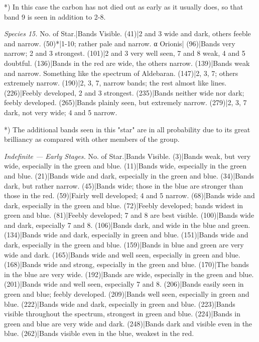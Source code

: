 \documentclass[a4paper, 12pt, oneside, polutonikogreek, english]{article}
\begin{document}
*) In this case the carbon has not died out as early as it usually does, so that band 9 is seen in addition to 2-8.

\emph{Species 15.} 
No. of Star.|Bands Visible. 
(41)|2 and 3 wide and dark, others feeble and narrow. 
(50)*|1-10; rather pale and narrow. 
α Orionis| 
(96)|Bands very narrow; 2 and 3 strongest. 
(101)|2 and 3 very well seen, 7 and 8 weak, 4 and 5 doubtful. 
(136)|Bands in the red are wide, the others narrow. 
(139)|Bands weak and narrow. Something like the spectrum of Aldebaran. 
(147)|2, 3, 7; others extremely narrow. 
(190)|2, 3, 7, narrow bands; the rest almost like lines. 
(226)|Feebly developed, 2 and 3 strongest. 
(235)|Bands neither wide nor dark; feebly developed. 
(265)|Bands plainly seen, but extremely narrow. 
(279)|2, 3, 7 dark, not very wide; 4 and 5 narrow. 

*) The additional bands seen in this "star" are in all probability due to its great brilliancy as compared with other members of the group.

\emph{Indefinite --- Early Stages.} 
No. of Star.|Bands Visible. 
(3)|Bands weak, but very wide, especially in the green and blue. 
(11)|Bands wide, especially in the green and blue. 
(21)|Bands wide and dark, especially in the green and blue. 
(34)|Bands dark, but rather narrow. 
(45)|Bands wide; those in the blue are stronger than those in the red. 
(59)|Fairly well developed; 4 and 5 narrow. 
(68)|Bands wide and dark, especially in the green and blue. 
(72)|Feebly developed; bands widest in green and blue. 
(81)|Feebly developed; 7 and 8 are best visible. 
(100)|Bands wide and dark, especially 7 and 8. 
(106)|Bands dark, and wide in the blue and green.  
(134)|Bands wide and dark, especially in green and blue. 
(151)|Bands wide and dark, especially in the green and blue. 
(159)|Bands in blue and green are very wide and dark. 
(165)|Bands wide and well seen, especially in green and blue. 
(168)|Bands wide and strong, especially in the green and blue. 
(170)|The bands in the blue are very wide. 
(192)|Bands are wide, especially in the green and blue. 
(201)|Bands wide and well seen, especially 7 and 8. 
(206)|Bands easily seen in green and blue; feebly developed. 
(209)|Bands well seen, especially in green and blue. 
(222)|Bands wide and dark, especially in green and blue. 
(223)|Bands visible throughout the spectrum, strongest in green and blue. 
(224)|Bands in green and blue are very wide and dark. 
(248)|Bands dark and visible even in the blue. 
(262)|Bands visible even in the blue, weakest in the red. 
\end{document}
